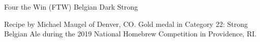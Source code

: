 \begin{recipe}{Four the Win (FTW) Belgian Dark Strong} %

\begin{aboutblock}
Recipe by Michael Maugel of Denver, CO. Gold medal in Category 22: Strong
Belgian Ale during the 2019 National Homebrew Competition in Providence, RI.
\sourceaha
\end{aboutblock}


\begin{methodandtiming}
 
\begin{mashsteps}
\end{mashsteps}

\begin{fermentationsteps}
\end{fermentationsteps}

\end{methodandtiming}

\recipebreak

\begin{ingredientsblock}

\begin{malts}
\end{malts}

\begin{hops}
\end{hops}


\end{ingredientsblock}

\end{recipe}

